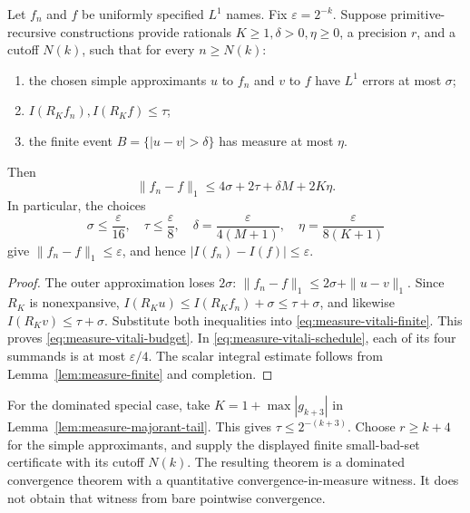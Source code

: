 \begin{theorem}
\label{thm:measure-vitali}
Let \(f_n\) and \(f\) be uniformly specified \(L^1\) names.  Fix
\(\varepsilon=2^{-k}\).  Suppose primitive-recursive constructions provide
rationals \(K\geq1,\delta>0,\eta\geq0\), a precision \(r\), and a
cutoff \(N(k)\), such that for every \(n\geq N(k)\):
\begin{enumerate}
 \item the chosen simple approximants \(u\) to \(f_n\) and \(v\) to
 \(f\) have \(L^1\) errors at most \(\sigma\);
 \item \(I(R_Kf_n),I(R_Kf)\leq\tau\);
 \item the finite event \(B=\{|u-v|>\delta\}\) has measure at most
 \(\eta\).
\end{enumerate}
Then
\begin{equation}
 \|f_n-f\|_1\leq4\sigma+2\tau+\delta M+2K\eta.
 \label{eq:measure-vitali-budget}
\end{equation}
In particular, the choices
\begin{equation}
 \sigma\leq\frac{\varepsilon}{16},\quad
 \tau\leq\frac{\varepsilon}{8},\quad
 \delta=\frac{\varepsilon}{4(M+1)},\quad
 \eta=\frac{\varepsilon}{8(K+1)}
 \label{eq:measure-vitali-schedule}
\end{equation}
give \(\|f_n-f\|_1\leq\varepsilon\), and hence
\(|I(f_n)-I(f)|\leq\varepsilon\).
\end{theorem}

\begin{proof}
The outer approximation loses \(2\sigma\):
\(\|f_n-f\|_1\leq2\sigma+\|u-v\|_1\).
Since \(R_K\) is nonexpansive,
\(I(R_Ku)\leq I(R_Kf_n)+\sigma\leq\tau+\sigma\), and likewise
\(I(R_Kv)\leq\tau+\sigma\).  Substitute both inequalities into
\eqref{eq:measure-vitali-finite}.  This proves
\eqref{eq:measure-vitali-budget}.  In
\eqref{eq:measure-vitali-schedule}, each of its four summands is at most
\(\varepsilon/4\).  The scalar integral estimate follows from
Lemma~\ref{lem:measure-finite} and completion.
\end{proof}

For the dominated special case, take
\(K=1+\max|g_{k+3}|\) in Lemma~\ref{lem:measure-majorant-tail}.
This gives \(\tau\leq2^{-(k+3)}\).  Choose \(r\geq k+4\) for the
simple approximants, and supply the displayed finite small-bad-set
certificate with its cutoff \(N(k)\).  The resulting theorem is a dominated
convergence theorem with a quantitative convergence-in-measure witness.
It does not obtain that witness from bare pointwise convergence.

